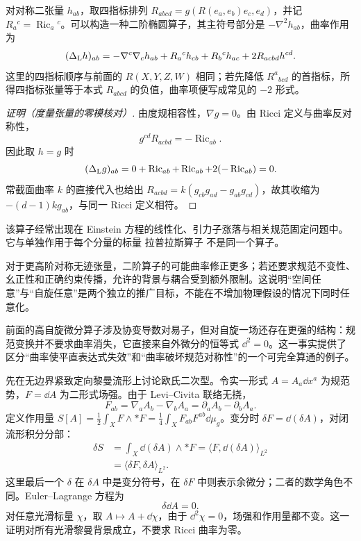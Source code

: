 对对称二张量 $h_{ab}$，取四指标排列 $R_{abcd}=g(R(e_a,e_b)e_c,e_d)$，并记 $R_a{}^c=\operatorname{Ric}_a{}^c$。可以构造一种二阶椭圆算子，其主符号部分是 $-\nabla^2h_{ab}$，曲率作用为
\begin{equation}\label{eq:ghs-lichnerowicz-two-tensor}
 (\Delta_{\rm L}h)_{ab}=-\nabla^c\nabla_ch_{ab}
 +R_a{}^ch_{cb}+R_b{}^ch_{ac}+2R_{acbd}h^{cd}.
\end{equation}
这里的四指标顺序与前面的 $R(X,Y,Z,W)$ 相同；若先降低 $R^a{}_{bcd}$ 的首指标，所得四指标张量等于本式 $R_{abcd}$ 的负值，曲率项便写成常见的 $-2$ 形式。
\begin{proof}[证明（度量张量的零模核对）]
由度规相容性，$\nabla g=0$。由 Ricci 定义与曲率反对称性，
\[
 g^{cd}R_{acbd}=-\operatorname{Ric}_{ab}.
\]
因此取 $h=g$ 时
\[
 (\Delta_{\rm L}g)_{ab}
 =0+\operatorname{Ric}_{ab}+\operatorname{Ric}_{ab}
 +2(-\operatorname{Ric}_{ab})=0.
\]
常截面曲率 $k$ 的直接代入也给出 $R_{acbd}=k(g_{cb}g_{ad}-g_{ab}g_{cd})$，故其收缩为 $-(d-1)kg_{ab}$，与同一 Ricci 定义相符。
\end{proof}
该算子经常出现在 Einstein 方程的线性化、引力子涨落与相关规范固定问题中。它与单独作用于每个分量的标量 拉普拉斯算子 不是同一个算子。

对于更高阶对称无迹张量，二阶算子的可能曲率修正更多；若还要求规范不变性、幺正性和正确约束传播，允许的背景与耦合受到额外限制。这说明“空间任意”与“自旋任意”是两个独立的推广目标，不能在不增加物理假设的情况下同时任意化。

前面的高自旋微分算子涉及协变导数对易子，但对自旋一场还存在更强的结构：规范变换并不要求曲率消失，它直接来自外微分的恒等式 $\dd^2=0$。这一事实提供了区分“曲率使平直表达式失效”和“曲率破坏规范对称性”的一个可完全算通的例子。

先在无边界紧致定向黎曼流形上讨论欧氏二次型。令实一形式 $A=A_a\dd x^a$ 为规范势，$F=\dd A$ 为二形式场强。由于 Levi--Civita 联络无挠，
\begin{equation}\label{eq:ghs-r9-maxwell-fieldstrength}
 F_{ab}=\nabla_aA_b-\nabla_bA_a
 =\partial_aA_b-\partial_bA_a.
\end{equation}
定义作用量 $S[A]=\tfrac12\int_X F\wedge *F=\tfrac14\int_XF_{ab}F^{ab}\dd\mu_g$。变分时 $\delta F=\dd(\delta A)$，对闭流形积分分部：
\begin{align*}
 \delta S
 &=\int_X\dd(\delta A)\wedge *F
 =\langle F,\dd(\delta A)\rangle_{L^2}\\
 &=\langle\delta F,\delta A\rangle_{L^2}.
\end{align*}
这里最后一个 $\delta$ 在 $\delta A$ 中是变分符号，在 $\delta F$ 中则表示余微分；二者的数学角色不同。Euler--Lagrange 方程为
\begin{equation}\label{eq:ghs-r9-maxwell-coexact-eom}
 \delta\dd A=0.
\end{equation}
对任意光滑标量 $\chi$，取 $A\mapsto A+\dd\chi$，由于 $\dd^2\chi=0$，场强和作用量都不变。这一证明对所有光滑黎曼背景成立，不要求 Ricci 曲率为零。

